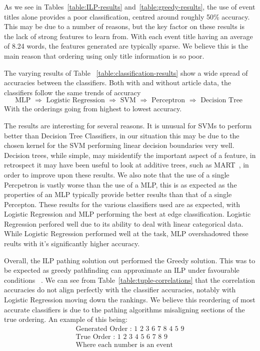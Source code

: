 \documentclass[bsc,frontabs,twoside,singlespacing,parskip,deptreport]{infthesis}     %
\begin{document}
As we see in  Tables~\ref{table:ILP-results} and~\ref{table:greedy-results}, the use of event titles alone
provides a poor classification, centred around roughly 50\% accuracy. This may be due to a number of reasons,
but the key factor on these results is the lack of strong features to learn from. With each event title having an average of
8.24 words, the features generated are typically  sparse. We believe this is the main reason that ordering using
only title information is so poor.

The varying results of Table ~\ref{table:classification-results} show a wide spread of accuracies between the classifiers.
Both with and without article data, the classifiers follow the same trends of accuracy
\begin{equation}
\text{MLP $\Rightarrow$ Logistic Regression $\Rightarrow$ SVM $\Rightarrow$ Perceptron $\Rightarrow$ Decision Tree }\nonumber  
\end{equation}
With the orderings going from highest to lowest accuracy.

The results are interesting for several reasons.
It is unusual for SVMs to perform better than Decision Tree Classifiers, in our situation this may be due to the chosen
kernel for the SVM performing linear decision boundaries very well. Decision trees, while simple, may misidentify the important
aspect of a  feature, in retrospect it may have been useful to look at additive trees, such as MART~\cite{}, in order to
improve upon these results.
We also note that the use of a single Percpetron is vastly worse than the use of a MLP, this is as expected as
the properties of an MLP typically provide better results than that of a single Percepton.
These results for the various classifiers used are as expected, with Logistic Regression and MLP performing the best
at edge classification. Logistic Regression perfored well due to its ability to deal with linear categorical data.
While Logistic Regression performed well at the task, MLP overshadowed these reults with it's significantly higher
accuracy. 


Overall, the ILP pathing solution out performed the Greedy solution. This was to be expected as greedy pathfinding can
approximate an ILP under favourable conditions ~\cite{}. We can see from Table~\ref{table:tuple-correlations} that the
correlation accuracies do not align perfectly with the classifier accuracies, notably with Logistic Regression moving
down the rankings. We believe this reordering of most accurate classifiers is due to the pathing algorithms misaligning
sections of the true ordering. An example of this being:
\begin{align}\nonumber
  \text{Generated Order : 1 2 3 6 7 8 4 5 9}\\\nonumber
  \text{True Order : 1 2 3 4 5 6 7 8 9}\\\nonumber
  \text{Where each number is an event}\nonumber
\end{align}
\end{document}
